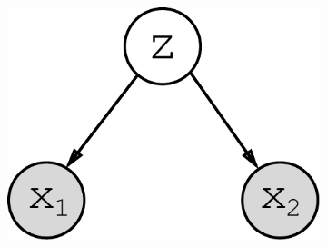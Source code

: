 \documentclass{article}
\begin{document}
\begin{figure}[!h]
\centering
    \begin{subfigure}[b]{.24\linewidth}
        \centering
        \includegraphics[width=.75\linewidth]{graph.pdf}
        \caption{}
        \label{fig:diagram:graph}
    \end{subfigure}\hspace{5mm}
    \begin{subfigure}[b]{.10\linewidth}

\end{subfigure}
\end{figure}
\end{document}
